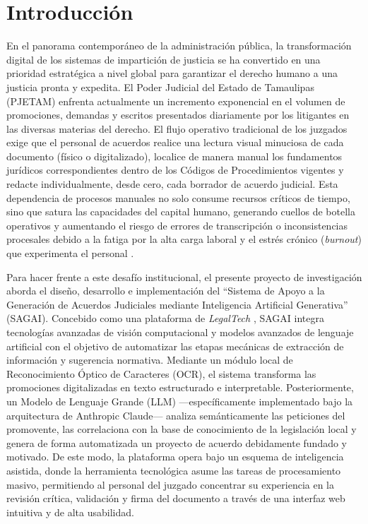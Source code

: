 \section{Introducción}
\label{ch:introduccion}

En el panorama contemporáneo de la administración pública, la transformación digital de los sistemas de impartición de justicia se ha convertido en una prioridad estratégica a nivel global para garantizar el derecho humano a una justicia pronta y expedita. El Poder Judicial del Estado de Tamaulipas (PJETAM) enfrenta actualmente un incremento exponencial en el volumen de promociones, demandas y escritos presentados diariamente por los litigantes en las diversas materias del derecho. El flujo operativo tradicional de los juzgados exige que el personal de acuerdos realice una lectura visual minuciosa de cada documento (físico o digitalizado), localice de manera manual los fundamentos jurídicos correspondientes dentro de los Códigos de Procedimientos vigentes y redacte individualmente, desde cero, cada borrador de acuerdo judicial. Esta dependencia de procesos manuales no solo consume recursos críticos de tiempo, sino que satura las capacidades del capital humano, generando cuellos de botella operativos y aumentando el riesgo de errores de transcripción o inconsistencias procesales debido a la fatiga por la alta carga laboral y el estrés crónico (\textit{burnout}) que experimenta el personal \cite{Fine2024}.

Para hacer frente a este desafío institucional, el presente proyecto de investigación aborda el diseño, desarrollo e implementación del ``Sistema de Apoyo a la Generación de Acuerdos Judiciales mediante Inteligencia Artificial Generativa'' (SAGAI). Concebido como una plataforma de \textit{LegalTech} \cite{Bakshi2024}, SAGAI integra tecnologías avanzadas de visión computacional y modelos avanzados de lenguaje artificial con el objetivo de automatizar las etapas mecánicas de extracción de información y sugerencia normativa. Mediante un módulo local de Reconocimiento Óptico de Caracteres (OCR), el sistema transforma las promociones digitalizadas en texto estructurado e interpretable. Posteriormente, un Modelo de Lenguaje Grande (LLM) —específicamente implementado bajo la arquitectura de Anthropic Claude— \cite{Bhatt2024} analiza semánticamente las peticiones del promovente, las correlaciona con la base de conocimiento de la legislación local y genera de forma automatizada un proyecto de acuerdo debidamente fundado y motivado. De este modo, la plataforma opera bajo un esquema de inteligencia asistida, donde la herramienta tecnológica asume las tareas de procesamiento masivo, permitiendo al personal del juzgado concentrar su experiencia en la revisión crítica, validación y firma del documento a través de una interfaz web intuitiva y de alta usabilidad.

